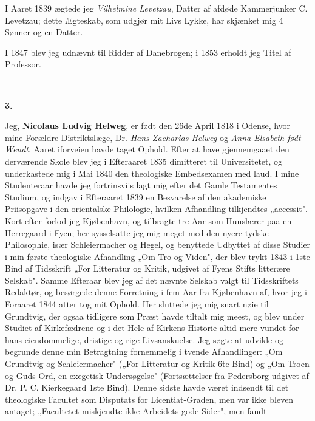 \documentclass[12pt,a4paper]{article}
\newcommand{\opage}[1]{\marginnote{\footnotesize\textit{[#1]}}}
\begin{document}
I Aaret 1839 ægtede jeg \emph{Vilhelmine Levetzau}, Datter af afdøde Kammerjunker
C. Levetzau; dette Ægteskab, som udgjør mit Livs Lykke, har skjænket mig 4 Sønner
og en Datter.

I 1847 blev jeg udnævnt til Ridder af Danebrogen; i 1853 erholdt jeg Titel af
Professor.

\begin{center}---\end{center}

\begin{center}\textbf{3.}\end{center}

Jeg, \textbf{Nicolaus Ludvig Helweg}, er født den 26de April 1818 i Odense, hvor
mine Forældre Distriktslæge, Dr. \emph{Hans Zacharias Helweg} og \emph{Anna
Elsabeth født Wendt}, Aaret iforveien havde taget Ophold. Efter at have
gjennemgaaet den derværende Skole blev jeg i Efteraaret 1835 dimitteret til
Universitetet, og underkastede mig i Mai 1840 den theologiske Embedsexamen med
laud. I mine Studenteraar havde jeg fortrinsviis lagt mig efter det Gamle
Testamentes Studium, og indgav i Efteraaret 1839 en Besvarelse af den akademiske
Priisopgave i den orientalske Philologie, hvilken Afhandling tilkjendtes
„accessit". Kort efter forlod jeg Kjøbenhavn, og tilbragte tre Aar som Huuslærer
paa en Herregaard i Fyen; her sysselsatte jeg mig meget med den nyere tydske
Philosophie, især Schleiermacher og Hegel, og benyttede Udbyttet af disse Studier
i min første theologiske Afhandling „Om Tro og Viden", der blev trykt 1843 i 1ste
Bind af Tidsskrift „For Litteratur og Kritik, udgivet af Fyens Stifts litterære
Selskab". Samme Efteraar blev jeg af det nævnte Selskab valgt til Tidsskriftets
Redaktør, og besørgede denne
\opage{45} Forretning i fem Aar fra Kjøbenhavn af, hvor jeg i Foraaret 1844 atter tog mit
Ophold. Her sluttede jeg mig snart nøie til Grundtvig, der ogsaa tidligere som
Præst havde tiltalt mig meest, og blev under Studiet af Kirkefædrene og i det Hele
af Kirkens Historie altid mere vundet for hans eiendommelige, dristige og rige
Livsanskuelse. Jeg søgte at udvikle og begrunde denne min Betragtning fornemmelig
i tvende Afhandlinger: „Om Grundtvig og Schleiermacher" („For Litteratur og Kritik
6te Bind) og „Om Troen og Guds Ord, en exegetisk Undersøgelse" (Fortsættelser fra
Pedersborg udgivet af Dr. P. C. Kierkegaard 1ste Bind). Denne sidste havde været
indsendt til det theologiske Facultet som Disputats for Licentiat-Graden, men var
ikke bleven antaget; „Facultetet miskjendte ikke Arbeidets gode Sider", men fandt
\end{document}
